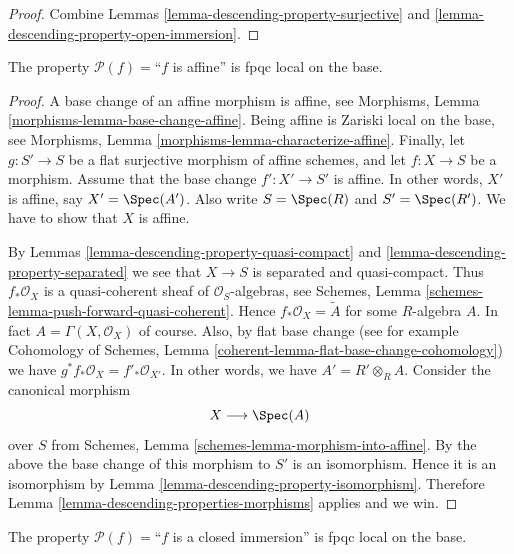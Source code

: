 \begin{proof}
Combine Lemmas \ref{lemma-descending-property-surjective}
and \ref{lemma-descending-property-open-immersion}.
\end{proof}

\begin{lemma}
\label{lemma-descending-property-affine}
The property $\mathcal{P}(f) =$``$f$ is affine''
is fpqc local on the base.
\end{lemma}

\begin{proof}
A base change of an affine morphism is affine, see
Morphisms, Lemma \ref{morphisms-lemma-base-change-affine}.
Being affine is Zariski local on the base, see
Morphisms, Lemma \ref{morphisms-lemma-characterize-affine}.
Finally, let
$g : S' \to S$ be a flat surjective morphism of affine schemes,
and let $f : X \to S$ be a morphism. Assume that the base change
$f' : X' \to S'$ is affine. In other words, $X'$ is affine, say
$X' = \Spec(A')$. Also write $S = \Spec(R)$
and $S' = \Spec(R')$. We have to show that $X$ is affine.

\medskip\noindent
By Lemmas \ref{lemma-descending-property-quasi-compact}
and \ref{lemma-descending-property-separated} we see that
$X \to S$ is separated and quasi-compact. Thus
$f_*\mathcal{O}_X$ is a quasi-coherent sheaf of $\mathcal{O}_S$-algebras,
see Schemes, Lemma \ref{schemes-lemma-push-forward-quasi-coherent}.
Hence $f_*\mathcal{O}_X = \widetilde{A}$ for some $R$-algebra $A$.
In fact $A = \Gamma(X, \mathcal{O}_X)$ of course.
Also, by flat base change
(see for example
Cohomology of Schemes, Lemma \ref{coherent-lemma-flat-base-change-cohomology})
we have $g^*f_*\mathcal{O}_X = f'_*\mathcal{O}_{X'}$.
In other words, we have $A' = R' \otimes_R A$.
Consider the canonical morphism
$$
X \longrightarrow \Spec(A)
$$
over $S$ from Schemes, Lemma \ref{schemes-lemma-morphism-into-affine}.
By the above the base change of this morphism to $S'$ is an isomorphism.
Hence it is an isomorphism by
Lemma \ref{lemma-descending-property-isomorphism}.
Therefore Lemma \ref{lemma-descending-properties-morphisms} applies and we win.
\end{proof}

\begin{lemma}
\label{lemma-descending-property-closed-immersion}
The property $\mathcal{P}(f) =$``$f$ is a closed immersion''
is fpqc local on the base.
\end{lemma}

